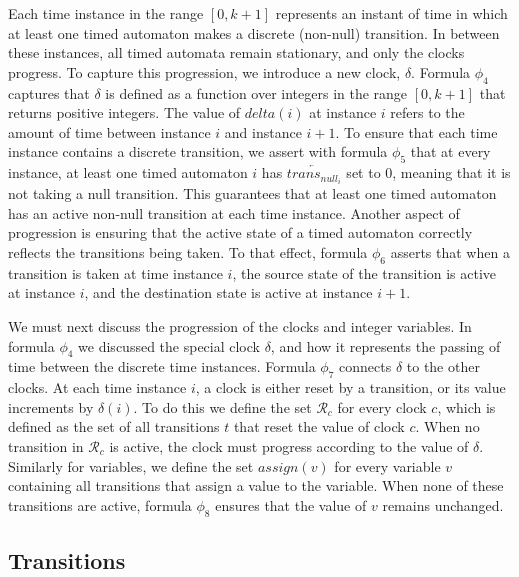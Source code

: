 \documentclass[a4paper,12pt]{article}
\begin{document}
Each time instance in the range \([0,k+1]\) represents an instant of time in
which at least one timed automaton makes a discrete (non-null) transition. In
between these instances, all timed automata remain stationary, and only the
clocks progress. To capture this progression, we introduce a new clock,
\(\delta\). Formula \(\phi_4\) captures that \(\delta\) is defined as a function
over integers in the range \([0,k+1]\) that returns positive integers. The value
of \(delta(i)\) at instance \(i\) refers to the amount of time between instance
\(i\) and instance \(i+1\). To ensure that each time instance contains a
discrete transition, we assert with formula \(\phi_5\) that at every instance,
at least one timed automaton \(i\) has \(\overleftarrow{trans_{null_i}}\) set to
0, meaning that it is not taking a null transition. This guarantees that at
least one timed automaton has an active non-null transition at each time
instance. Another aspect of progression is ensuring that the active state of a
timed automaton correctly reflects the transitions being taken. To that effect,
formula \(\phi_6\) asserts that when a transition is taken at time instance
\(i\), the source state of the transition is active at instance \(i\), and the
destination state is active at instance \(i+1\).

We must next discuss the progression of the clocks and integer variables. In
formula \(\phi_4\) we discussed the special clock \(\delta\), and how it
represents the passing of time between the discrete time instances. Formula
\(\phi_7\) connects \(\delta\) to the other clocks. At each time instance \(i\),
a clock is either reset by a transition, or its value increments by
\(\delta(i)\). To do this we define the set \(\mathcal{R}_c\) for every clock
\(c\), which is defined as the set of all transitions \(t\) that reset the value
of clock \(c\). When no transition in \(\mathcal{R}_c\) is active, the clock
must progress according to the value of \(\delta\). Similarly for variables, we
define the set \(assign(v)\) for every variable \(v\) containing all transitions
that assign a value to the variable. When none of these transitions are active,
formula \(\phi_8\) ensures that the value of \(v\) remains unchanged.

\subsection{Transitions}\label{consstraints-trans}
\end{document}
